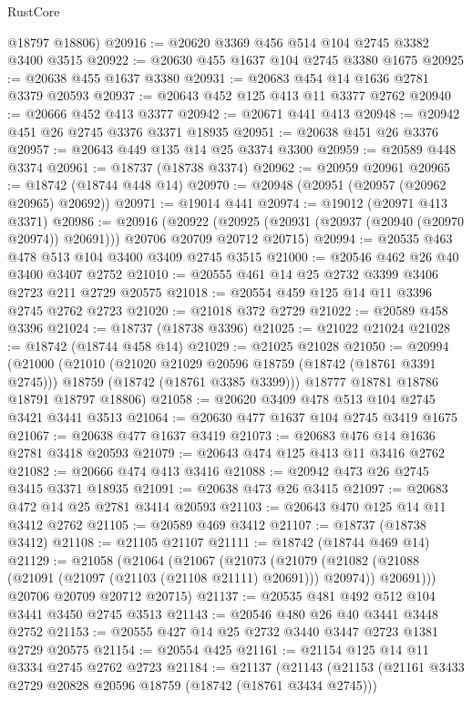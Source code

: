 \begin{lexlean}{RustCore}
\begin{coremodule}
      @18797
      @18806)
@20916 := @20620 @3369 @456 @514 @104 @2745 @3382 @3400 @3515
@20922 := @20630 @455 @1637 @104 @2745 @3380 @1675
@20925 := @20638 @455 @1637 @3380
@20931 := @20683 @454 @14 @1636 @2781 @3379 @20593
@20937 := @20643 @452 @125 @413 @11 @3377 @2762
@20940 := @20666 @452 @413 @3377
@20942 := @20671 @441 @413
@20948 := @20942 @451 @26 @2745 @3376 @3371 @18935
@20951 := @20638 @451 @26 @3376
@20957 := @20643 @449 @135 @14 @25 @3374 @3300
@20959 := @20589 @448 @3374
@20961 := @18737 (@18738 @3374)
@20962 := @20959 @20961
@20965 := @18742 (@18744 @448 @14)
@20970 := @20948 (@20951 (@20957 (@20962 @20965) @20692))
@20971 := @19014 @441
@20974 := @19012 (@20971 @413 @3371)
@20986 := @20916
    (@20922 (@20925 (@20931 (@20937 (@20940 (@20970 @20974)) @20691))) @20706 @20709 @20712 @20715)
@20994 := @20535 @463 @478 @513 @104 @3400 @3409 @2745 @3515
@21000 := @20546 @462 @26 @40 @3400 @3407 @2752
@21010 := @20555 @461 @14 @25 @2732 @3399 @3406 @2723 @211 @2729 @20575
@21018 := @20554 @459 @125 @14 @11 @3396 @2745 @2762 @2723
@21020 := @21018 @372 @2729
@21022 := @20589 @458 @3396
@21024 := @18737 (@18738 @3396)
@21025 := @21022 @21024
@21028 := @18742 (@18744 @458 @14)
@21029 := @21025 @21028
@21050 := @20994
    (@21000
      (@21010
        (@21020 @21029 @20596 @18759 (@18742 (@18761 @3391 @2745)))
        @18759
        (@18742 (@18761 @3385 @3399)))
      @18777
      @18781
      @18786
      @18791
      @18797
      @18806)
@21058 := @20620 @3409 @478 @513 @104 @2745 @3421 @3441 @3513
@21064 := @20630 @477 @1637 @104 @2745 @3419 @1675
@21067 := @20638 @477 @1637 @3419
@21073 := @20683 @476 @14 @1636 @2781 @3418 @20593
@21079 := @20643 @474 @125 @413 @11 @3416 @2762
@21082 := @20666 @474 @413 @3416
@21088 := @20942 @473 @26 @2745 @3415 @3371 @18935
@21091 := @20638 @473 @26 @3415
@21097 := @20683 @472 @14 @25 @2781 @3414 @20593
@21103 := @20643 @470 @125 @14 @11 @3412 @2762
@21105 := @20589 @469 @3412
@21107 := @18737 (@18738 @3412)
@21108 := @21105 @21107
@21111 := @18742 (@18744 @469 @14)
@21129 := @21058
    (@21064
      (@21067
        (@21073
          (@21079
            (@21082 (@21088 (@21091 (@21097 (@21103 (@21108 @21111) @20691))) @20974))
            @20691)))
      @20706
      @20709
      @20712
      @20715)
@21137 := @20535 @481 @492 @512 @104 @3441 @3450 @2745 @3513
@21143 := @20546 @480 @26 @40 @3441 @3448 @2752
@21153 := @20555 @427 @14 @25 @2732 @3440 @3447 @2723 @1381 @2729 @20575
@21154 := @20554 @425
@21161 := @21154 @125 @14 @11 @3334 @2745 @2762 @2723
@21184 := @21137
    (@21143
      (@21153
        (@21161 @3433 @2729 @20828 @20596 @18759 (@18742 (@18761 @3434 @2745)))

\end{coremodule}
\end{lexlean}
